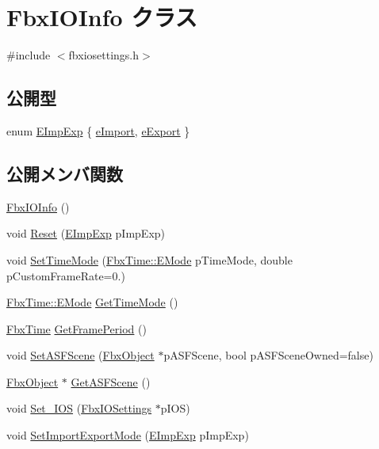 \hypertarget{class_fbx_i_o_info}{}\section{Fbx\+I\+O\+Info クラス}
\label{class_fbx_i_o_info}


{\ttfamily \#include $<$fbxiosettings.\+h$>$}

\subsection*{公開型}
\begin{DoxyCompactItemize}
\item 
enum \hyperlink{class_fbx_i_o_info_a0c167beca637e7a1f723942694d61c75}{E\+Imp\+Exp} \{ \hyperlink{class_fbx_i_o_info_a0c167beca637e7a1f723942694d61c75a17dc8cef279221a941a53f27968ac86b}{e\+Import}, 
\hyperlink{class_fbx_i_o_info_a0c167beca637e7a1f723942694d61c75a08a423433e6184e5ce5fd1e4aa249dcc}{e\+Export}
 \}
\end{DoxyCompactItemize}
\subsection*{公開メンバ関数}
\begin{DoxyCompactItemize}
\item 
\hyperlink{class_fbx_i_o_info_a063e2e4de1d20e31bce2d2aa20dc1567}{Fbx\+I\+O\+Info} ()
\item 
void \hyperlink{class_fbx_i_o_info_a9fbc4993a076a3f91fdda9a29014dff4}{Reset} (\hyperlink{class_fbx_i_o_info_a0c167beca637e7a1f723942694d61c75}{E\+Imp\+Exp} p\+Imp\+Exp)
\item 
void \hyperlink{class_fbx_i_o_info_a6d1d7eda11ddc3d6df891ef2b3039246}{Set\+Time\+Mode} (\hyperlink{class_fbx_time_acc529b00a0e8d4c3da3702449ca93031}{Fbx\+Time\+::\+E\+Mode} p\+Time\+Mode, double p\+Custom\+Frame\+Rate=0.)
\item 
\hyperlink{class_fbx_time_acc529b00a0e8d4c3da3702449ca93031}{Fbx\+Time\+::\+E\+Mode} \hyperlink{class_fbx_i_o_info_afe331ddda425067f8577e78c0c955bbb}{Get\+Time\+Mode} ()
\item 
\hyperlink{class_fbx_time}{Fbx\+Time} \hyperlink{class_fbx_i_o_info_a8b6516f2703015a23c0d79931dd01c45}{Get\+Frame\+Period} ()
\item 
void \hyperlink{class_fbx_i_o_info_a03a29954f14eb3596b1d887fc68f9bfc}{Set\+A\+S\+F\+Scene} (\hyperlink{class_fbx_object}{Fbx\+Object} $\ast$p\+A\+S\+F\+Scene, bool p\+A\+S\+F\+Scene\+Owned=false)
\item 
\hyperlink{class_fbx_object}{Fbx\+Object} $\ast$ \hyperlink{class_fbx_i_o_info_ad55af50ad7d761db82760482bff22171}{Get\+A\+S\+F\+Scene} ()
\item 
void \hyperlink{class_fbx_i_o_info_aa6b34fce0426b8f61f05262168c3004e}{Set\+\_\+\+I\+OS} (\hyperlink{class_fbx_i_o_settings}{Fbx\+I\+O\+Settings} $\ast$p\+I\+OS)
\item 
void \hyperlink{class_fbx_i_o_info_a9043330ba9959715f579ff2a614f33c5}{Set\+Import\+Export\+Mode} (\hyperlink{class_fbx_i_o_info_a0c167beca637e7a1f723942694d61c75}{E\+Imp\+Exp} p\+Imp\+Exp)
\end{DoxyCompactItemize}


